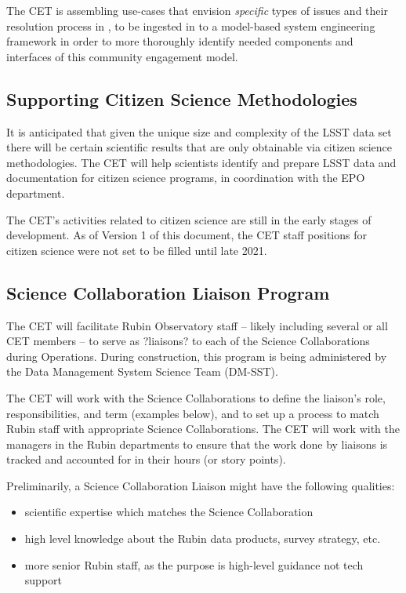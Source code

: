 \documentclass[DM,lsstdraft,toc]{lsstdoc}
\begin{document}
The CET is assembling use-cases that envision \textit{specific} types of issues and their resolution process in , to be ingested in to a model-based system engineering framework in order to more thoroughly identify needed components and interfaces of this community engagement model.


\subsection{Supporting Citizen Science Methodologies}\label{ssec:mod_citizen}

It is anticipated that given the unique size and complexity of the LSST data set there will be certain scientific results that are only obtainable via citizen science methodologies.
The CET will help scientists identify and prepare LSST data and documentation for citizen science programs, in coordination with the EPO department. 

The CET's activities related to citizen science are still in the early stages of development.
As of Version 1 of this document, the CET staff positions for citizen science were not set to be filled until late 2021.


\subsection{Science Collaboration Liaison Program}\label{ssec:mod_liaisons}

The CET will facilitate Rubin Observatory staff -- likely including several or all CET members -- to serve as ?liaisons? to each of the Science Collaborations during Operations. 
During construction, this program is being administered by the Data Management System Science Team (DM-SST).

The CET will work with the Science Collaborations to define the liaison's role, responsibilities, and term (examples below), and to set up a process to match Rubin staff with appropriate Science Collaborations.
The CET will work with the managers in the Rubin departments to ensure that the work done by liaisons is tracked and accounted for in their hours (or story points). 

Preliminarily, a Science Collaboration Liaison might have the following qualities:
\begin{itemize}
\item scientific expertise which matches the Science Collaboration
\item high level knowledge about the Rubin data products, survey strategy, etc. 
\item more senior Rubin staff, as the purpose is high-level guidance not tech support
\end{itemize}
\end{document}
